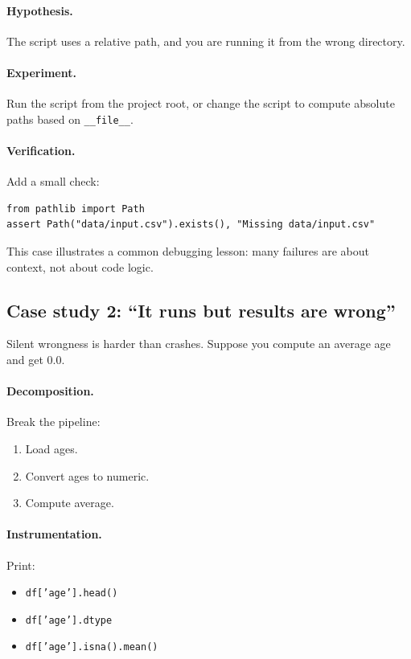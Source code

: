 \paragraph{Hypothesis.} The script uses a relative path, and you are running it from the wrong directory.

\paragraph{Experiment.} Run the script from the project root, or change the script to compute absolute paths based on \texttt{\_\_file\_\_}.

\paragraph{Verification.} Add a small check:
\begin{verbatim}
from pathlib import Path
assert Path("data/input.csv").exists(), "Missing data/input.csv"
\end{verbatim}

This case illustrates a common debugging lesson: many failures are about context, not about code logic.

\subsection{Case study 2: ``It runs but results are wrong''}
Silent wrongness is harder than crashes. Suppose you compute an average age and get 0.0.

\paragraph{Decomposition.} Break the pipeline:
\begin{enumerate}[noitemsep]
  \item Load ages.
  \item Convert ages to numeric.
  \item Compute average.
\end{enumerate}

\paragraph{Instrumentation.} Print:
\begin{itemize}[noitemsep]
  \item \texttt{df['age'].head()}
  \item \texttt{df['age'].dtype}
  \item \texttt{df['age'].isna().mean()}
\end{itemize}

